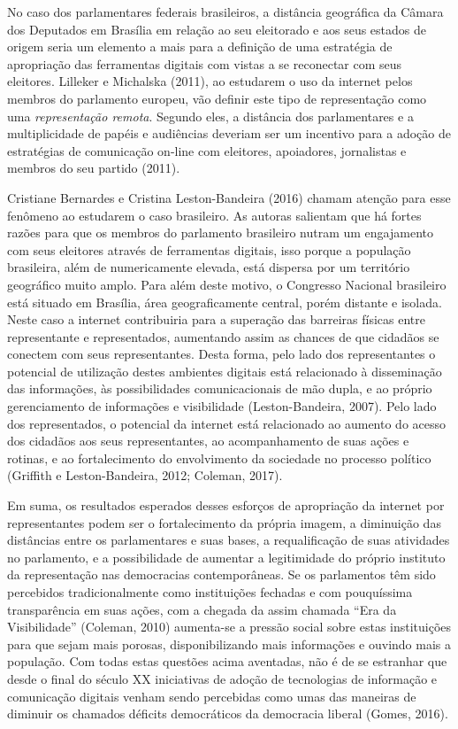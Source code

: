 No caso dos parlamentares federais brasileiros, a distância geográfica
da Câmara dos Deputados em Brasília em relação ao seu eleitorado e aos
seus estados de origem seria um elemento a mais para a definição de uma
estratégia de apropriação das ferramentas digitais com vistas a se
reconectar com seus eleitores. Lilleker e Michalska (2011), ao estudarem
o uso da internet pelos membros do parlamento europeu, vão definir este
tipo de representação como uma \emph{representação remota}. Segundo
eles, a distância dos parlamentares e a multiplicidade de papéis e
audiências deveriam ser um incentivo para a adoção de estratégias de
comunicação on-line com eleitores, apoiadores, jornalistas e membros do
seu partido (2011).

Cristiane Bernardes e Cristina Leston-Bandeira (2016) chamam atenção
para esse fenômeno ao estudarem o caso brasileiro. As autoras salientam
que há fortes razões para que os membros do parlamento brasileiro nutram
um engajamento com seus eleitores através de ferramentas digitais, isso
porque a população brasileira, além de numericamente elevada, está
dispersa por um território geográfico muito amplo. Para além deste
motivo, o Congresso Nacional brasileiro está situado em Brasília, área
geograficamente central, porém distante e isolada. Neste caso a internet
contribuiria para a superação das barreiras físicas entre representante
e representados, aumentando assim as chances de que cidadãos se conectem
com seus representantes. Desta forma, pelo lado dos representantes o
potencial de utilização destes ambientes digitais está relacionado à
disseminação das informações, às possibilidades comunicacionais de mão
dupla, e ao próprio gerenciamento de informações e visibilidade
(Leston-Bandeira, 2007). Pelo lado dos representados, o potencial da
internet está relacionado ao aumento do acesso dos cidadãos aos seus
representantes, ao acompanhamento de suas ações e rotinas, e ao
fortalecimento do envolvimento da sociedade no processo político
(Griffith e Leston-Bandeira, 2012; Coleman, 2017).

Em suma, os resultados esperados desses esforços de apropriação da
internet por representantes podem ser o fortalecimento da própria
imagem, a diminuição das distâncias entre os parlamentares e suas bases,
a requalificação de suas atividades no parlamento, e a possibilidade de
aumentar a legitimidade do próprio instituto da representação nas
democracias contemporâneas. Se os parlamentos têm sido percebidos
tradicionalmente como instituições fechadas e com pouquíssima
transparência em suas ações, com a chegada da assim chamada ``Era da
Visibilidade'' (Coleman, 2010) aumenta-se a pressão social sobre estas
instituições para que sejam mais porosas, disponibilizando mais
informações e ouvindo mais a população. Com todas estas questões acima
aventadas, não é de se estranhar que desde o final do século XX
iniciativas de adoção de tecnologias de informação e comunicação
digitais venham sendo percebidas como umas das maneiras de diminuir os
chamados déficits democráticos da democracia liberal (Gomes, 2016).

